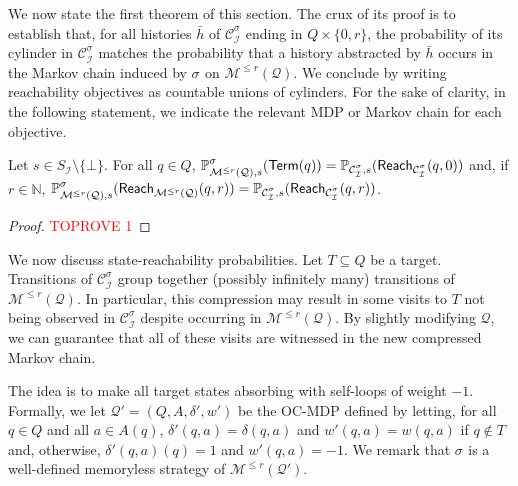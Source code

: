 \documentclass[a4paper,UKenglish,cleveref,autoref,thm-restate,colorlinks]{lipics-v2021}
\newcommand{\IN}{\mathbb{N}}
\newcommand{\mdp}{\mathcal{M}}
\newcommand{\mdpStateSpace}{S}
\newcommand{\hist}{h}
\newcommand{\weight}{w}
\newcommand{\ocmdp}{\mathcal{Q}}
\newcommand{\ocmdpFin}[2]{\mdp^{\leq #2}(#1)}
\newcommand{\ocStateSpace}{Q}
\newcommand{\ocState}{q}
\newcommand{\ocConfig}{s}
\newcommand{\ocActionSpace}{A}
\newcommand{\ocAction}{a}
\newcommand{\ocTrans}{\delta}
\newcommand{\counterUB}{r}
\newcommand{\mchain}{\mathcal{C}}
\newcommand{\intPart}{\mathcal{I}}
\newcommand{\compressChainStrat}[1]{\mchain^{#1}_{\intPart}}
\newcommand{\compressChain}{\compressChainStrat{\strat}}
\newcommand{\compressChainStateSpace}{\mdpStateSpace_{\intPart}}
\newcommand{\mcHist}{\bar{\hist}}
\newcommand{\reachVerb}[2]{\mathsf{Reach}_{#1}(#2)}
\newcommand{\target}{T}
\newcommand{\termination}{\mathsf{Term}}
\newcommand{\selectiveTermination}[1]{\termination({#1})}
\newcommand{\stratGeneric}[1]{{\sigma_{#1}}}
\newcommand{\strat}{\stratGeneric{}}
\begin{document}
We now state the first theorem of this section.
The crux of its proof is to establish that, for all histories $\mcHist$ of $\compressChain$ ending in $\ocStateSpace\times\{0, \counterUB\}$, the probability of its cylinder in $\compressChain$ matches the probability that a history abstracted by $\mcHist$ occurs in the Markov chain induced by $\strat$ on $\ocmdpFin{\ocmdp}{\counterUB}$.
We conclude by writing reachability objectives as countable unions of cylinders.
For the sake of clarity, in the following statement, we indicate the relevant MDP or Markov chain for each objective.
\begin{theorem}\label{theorem:ocmdp:probability matching}
  Let $\ocConfig \in\compressChainStateSpace\setminus\{\bot\}$.
  For all $\ocState\in\ocStateSpace$, $\probaGverb{\ocmdpFin{\ocmdp}{\counterUB}}{\ocConfig}{\strat}(\selectiveTermination{\ocState}) = \probaMCverb{\compressChain}{\ocConfig}(\reachVerb{\compressChain}{\ocState, 0})$ and,
  if $\counterUB\in\IN$, $\probaGverb{\ocmdpFin{\ocmdp}{\counterUB}}{\ocConfig}{\strat}(\reachVerb{\ocmdpFin{\ocmdp}{\counterUB}}{\ocState, \counterUB}) = \probaMCverb{\compressChain}{\ocConfig}(\reachVerb{\compressChain}{\ocState, \counterUB})$.
\end{theorem}
\begin{proof}\textcolor{red}{TOPROVE 1}\end{proof}

We now discuss state-reachability probabilities.
Let $\target\subseteq\ocStateSpace$ be a target.
Transitions of $\compressChain$ group together (possibly infinitely many) transitions of $\ocmdpFin{\ocmdp}{\counterUB}$.
In particular, this compression may result in some visits to $\target$ not being observed in $\compressChain$ despite occurring in $\ocmdpFin{\ocmdp}{\counterUB}$.
By slightly modifying $\ocmdp$, we can guarantee that all of these visits are witnessed in the new compressed Markov chain.

The idea is to make all target states absorbing with self-loops of weight $-1$.
Formally, we let $\ocmdp' = (\ocStateSpace, \ocActionSpace, \ocTrans', \weight')$ be the OC-MDP defined by letting, for all $\ocState\in\ocStateSpace$ and all $\ocAction\in\ocActionSpace(\ocState)$, $\ocTrans'(\ocState, \ocAction) = \ocTrans(\ocState, \ocAction)$ and $\weight'(\ocState, \ocAction) = \weight(\ocState, \ocAction)$ if $\ocState\notin\target$ and, otherwise, $\ocTrans'(\ocState, \ocAction)(\ocState)=1$ and $\weight'(\ocState, \ocAction)=-1$.
We remark that $\strat$ is a well-defined memoryless strategy of $\ocmdpFin{\ocmdp'}{\counterUB}$.
\end{document}
